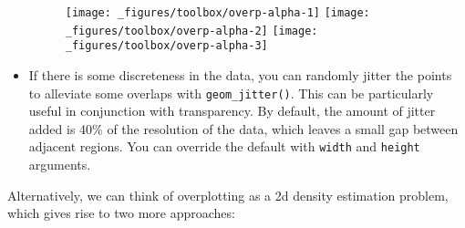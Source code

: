 \begin{itemize}
\begin{Shaded}
\begin{Highlighting}[]
\StringTok{ }\NormalTok{(}  \NormalTok{/}\StringTok{ }\NormalTok{)}
\StringTok{ }\NormalTok{(}  \NormalTok{/}\StringTok{ }\NormalTok{)}
\StringTok{ }\NormalTok{(}  \NormalTok{/}\StringTok{ }\NormalTok{)}
\end{Highlighting}
\end{Shaded}

  \begin{figure}[H]
    \texttt{[image: \_figures/toolbox/overp-alpha-1]}%
    \texttt{[image: \_figures/toolbox/overp-alpha-2]}%
    \texttt{[image: \_figures/toolbox/overp-alpha-3]}
  \end{figure}
\item
  If there is some discreteness in the data, you can randomly jitter the
  points to alleviate some overlaps with \texttt{geom\_jitter()}. This
  can be particularly useful in conjunction with transparency. By
  default, the amount of jitter added is 40\% of the resolution of the
  data, which leaves a small gap between adjacent regions. You can
  override the default with \texttt{width} and \texttt{height}
  arguments.
\end{itemize}

Alternatively, we can think of overplotting as a 2d density estimation
problem, which gives rise to two more approaches:

